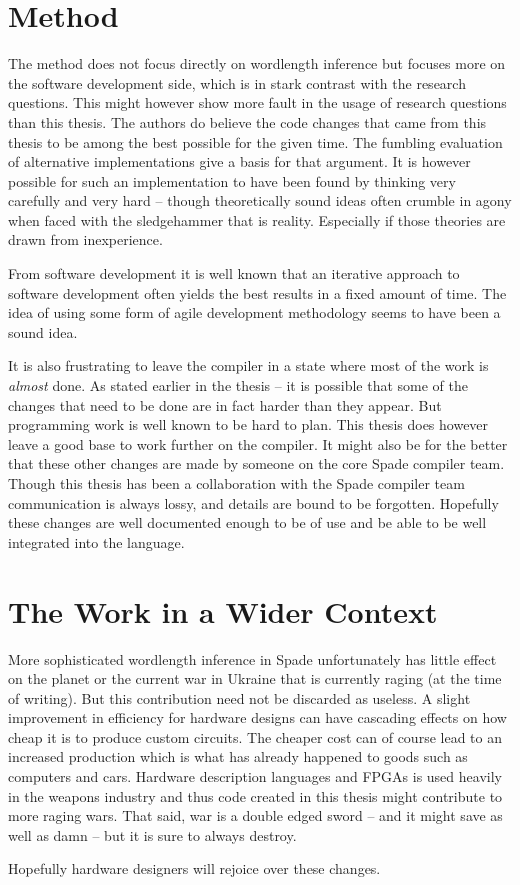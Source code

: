 \section{Method}
The method does not focus directly on wordlength inference but focuses more on the software development side, which is in stark contrast with the research questions. This might however show more fault in the usage of research questions than this thesis. The authors do believe the code changes that came from this thesis to be among the best possible for the given time. The fumbling evaluation of alternative implementations give a basis for that argument. It is however possible for such an implementation to have been found by thinking very carefully and very hard -- though theoretically sound ideas often crumble in agony when faced with the sledgehammer that is reality. Especially if those theories are drawn from inexperience.

From software development it is well known that an iterative approach to software development often yields the best results in a fixed amount of time. The idea of using some form of agile development methodology seems to have been a sound idea.

It is also frustrating to leave the compiler in a state where most of the work is \textit{almost} done. As stated earlier in the thesis -- it is possible that some of the changes that need to be done are in fact harder than they appear. But programming work is well known to be hard to plan. This thesis does however leave a good base to work further on the compiler. It might also be for the better that these other changes are made by someone on the core Spade compiler team. Though this thesis has been a collaboration with the Spade compiler team communication is always lossy, and details are bound to be forgotten. Hopefully these changes are well documented enough to be of use and be able to be well integrated into the language.

\section{The Work in a Wider Context}
More sophisticated wordlength inference in Spade unfortunately has little effect on the planet or the current war in Ukraine that is currently raging (at the time of writing). But this contribution need not be discarded as useless. A slight improvement in efficiency for hardware designs can have cascading effects on how cheap it is to produce custom circuits. The cheaper cost can of course lead to an increased production which is what has already happened to goods such as computers and cars. Hardware description languages and FPGAs is used heavily in the weapons industry and thus code created in this thesis might contribute to more raging wars. That said, war is a double edged sword -- and it might save as well as damn -- but it is sure to always destroy.

Hopefully hardware designers will rejoice over these changes.

